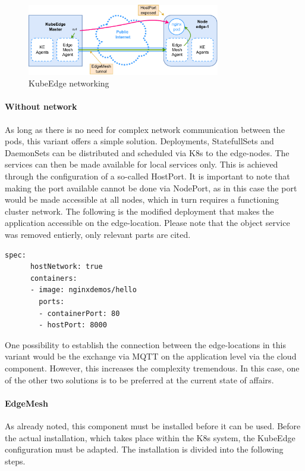 \documentclass[MSC,Master,english]{twbook}%
\begin{document}
\begin{figure}[ht]
    \centering
    \includegraphics[width=0.75\textwidth]{PICs/drawio/ke-network.drawio.pdf}
    \caption{KubeEdge networking}
    \label{fig:ke-networking}
\end{figure}

\paragraph{Without network} As long as there is no need for complex network communication between the pods, this variant offers a simple solution. Deployments, StatefullSets and DaemonSets can be distributed and scheduled via \ac{K8s} to the edge-nodes. The services can then be made available for local services only. This is achieved through the configuration of a so-called HostPort. It is important to note that making the port available cannot be done via NodePort, as in this case the port would be made accessible at all nodes, which in turn requires a functioning cluster network. The following is the modified deployment that makes the application accessible on the edge-location. Please note that the object service was removed entierly, only relevant parts are cited.
\begin{lstlisting}[caption={Web-application HostPort },captionpos=b]
    spec:
      hostNetwork: true
      containers:
      - image: nginxdemos/hello
        ports:
        - containerPort: 80
        - hostPort: 8000
\end{lstlisting}

One possibility to establish the connection between the edge-locations in this variant would be the exchange via MQTT on the application level via the cloud component. However, this increases the complexity tremendous. In this case, one of the other two solutions is to be preferred at the current state of affairs.

\paragraph{EdgeMesh} As already noted, this component must be installed before it can be used. Before the actual installation, which takes place within the \ac{K8s} system, the KubeEdge configuration must be adapted. The installation is divided into the following steps.
\end{document}

